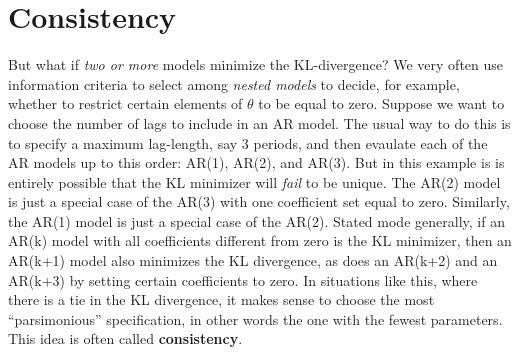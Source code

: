 \documentclass[12pt]{article}
\theoremstyle{definition}
\begin{document}
\section{Consistency}
But what if \emph{two or more} models minimize the KL-divergence? We very often use information criteria to select among \emph{nested models} to decide, for example, whether to restrict certain elements of $\theta$ to be equal to zero. Suppose we want to choose the number of lags to include in an AR model. The usual way to do this is to specify a maximum lag-length, say 3 periods, and then evaulate each of the AR models up to this order: AR(1), AR(2), and AR(3). But in this example is is entirely possible that the KL minimizer will \emph{fail} to be unique. The AR(2) model is just a special case of the AR(3) with one coefficient set equal to zero. Similarly, the AR(1) model is just a special case of the AR(2). Stated mode generally, if an AR(k) model with all coefficients different from zero is the KL minimizer, then an AR(k+1) model also minimizes the KL divergence, as does an AR(k+2) and an AR(k+3) by setting certain coefficients to zero. In situations like this, where there is a tie in the KL divergence, it makes sense to choose the most ``parsimonious'' specification, in other words the one with the fewest parameters. This idea is often called \textbf{consistency}.
\end{document}
